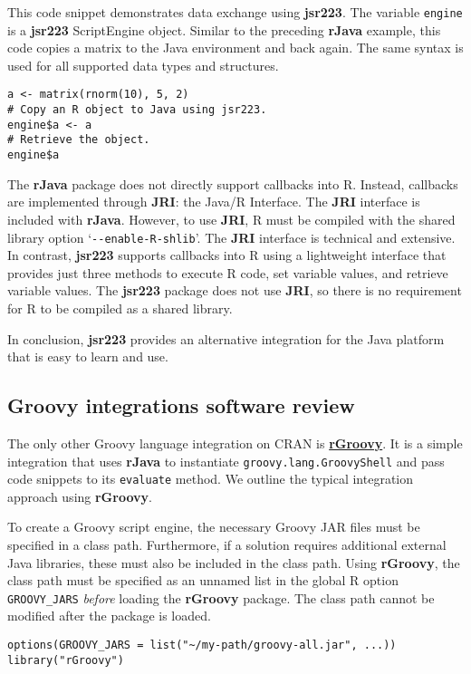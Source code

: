 \documentclass[
article,
11pt, %
a4paper, %
oneside, %
headinclude,footinclude, %
]{scrartcl}
\theoremstyle{definition} %
\theoremstyle{plain} %
\theoremstyle{remark} %
\newcommand{\pkg}[1]{\textbf{#1}}
\newcommand{\CRANpkg}[1]{\href{https://CRAN.R-project.org/package=#1}{\pkg{#1}}}
\newcommand{\code}[1]{\texttt{#1}}
\newcommand{\samp}[1]{{`\normalfont\texttt{#1}'}}
\begin{document}
This code snippet demonstrates data exchange using \pkg{jsr223}. The variable \code{engine} is a \pkg{jsr223} ScriptEngine object. Similar to the preceding \pkg{rJava} example, this code copies a matrix to the Java environment and back again. The same syntax is used for all supported data types and structures.

\begin{verbatim}
a <- matrix(rnorm(10), 5, 2)
# Copy an R object to Java using jsr223.
engine$a <- a
# Retrieve the object.
engine$a
\end{verbatim}

The \pkg{rJava} package does not directly support callbacks into R. Instead, callbacks are implemented through \pkg{JRI}: the Java/R Interface. The \pkg{JRI} interface is included with \pkg{rJava}. However, to use \pkg{JRI}, R must be compiled with the shared library option \samp{-{}-enable-R-shlib}. The \pkg{JRI} interface is technical and extensive. In contrast, \pkg{jsr223} supports callbacks into R using a lightweight interface that provides just three methods to execute R code, set variable values, and retrieve variable values. The \pkg{jsr223} package does not use \pkg{JRI}, so there is no requirement for R to be compiled as a shared library.

In conclusion, \pkg{jsr223} provides an alternative integration for the Java platform that is easy to learn and use.

\hypertarget{groovy-integrations}{}
\subsection{Groovy integrations software review}

The only other Groovy language integration on CRAN is \CRANpkg{rGroovy}. It is a simple integration that uses \pkg{rJava} to instantiate \code{groovy.lang.GroovyShell} and pass code snippets to its \code{evaluate} method. We outline the typical integration approach using \pkg{rGroovy}.

To create a Groovy script engine, the necessary Groovy JAR files must be specified in a class path. Furthermore, if a solution requires additional external Java libraries, these must also be included in the class path. Using \pkg{rGroovy}, the class path must be specified as an unnamed list in the global R option \code{GROOVY\_JARS} \textit{before} loading the \pkg{rGroovy} package. The class path cannot be modified after the package is loaded.

\begin{verbatim}
options(GROOVY_JARS = list("~/my-path/groovy-all.jar", ...))
library("rGroovy")
\end{verbatim}
\end{document}
